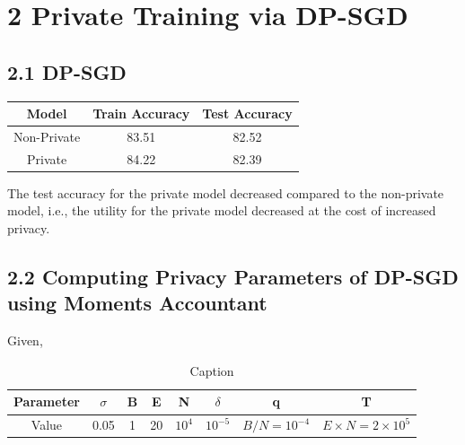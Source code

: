 
\usepackage{hyperref}
\usepackage{booktabs}
\usepackage{comment}
\usepackage{bbm}
\usepackage{mathtools}
\usepackage{amsfonts}
\usepackage{appendix}
\usepackage{csquotes}
\usepackage{amssymb}
\usepackage{listings}
\usepackage{float}
\usepackage{amsmath}
\lstset{
    frame = single,
    breaklines=true,
    basicstyle=\ttfamily}
\usepackage{tikz, forest}
\usepackage[square,numbers]{natbib}


\DeclareMathOperator*{\maximize}{maximize}
\DeclareMathOperator*{\minimize}{minimize}





\section*{2 Private Training via DP-SGD}
\subsection*{2.1 DP-SGD}

\begin{table}[h]
    \centering
    \begin{tabular}{| c | c | c |}
        \hline
        Model & Train Accuracy & Test Accuracy\\
        \hline 
        Non-Private & 83.51 & 82.52\\
        \hline
        Private & 84.22 & 82.39\\
        \hline
    \end{tabular}
\end{table}

The test accuracy for the private model decreased compared to the non-private model, i.e., the utility for the private model decreased at the cost of increased privacy.

\subsection*{2.2 Computing Privacy Parameters of DP-SGD using Moments Accountant}

Given,

\begin{table}[htp]
    \centering
    \begin{tabular}{|c|c|c|c|c|c|c|c|}
    \hline
        Parameter & $\sigma$ & B & 
        E & N & $\delta$ & q & T \\
        \hline
        Value & 0.05 & 1 & 20 & $10^4$ & $10^{-5}$ & $B/N = 10^{-4}$ & $E \times N = 2 \times 10^5$ \\
        \hline
    \end{tabular}
    \caption{Caption}
    \label{tab:my_label}
\end{table}

